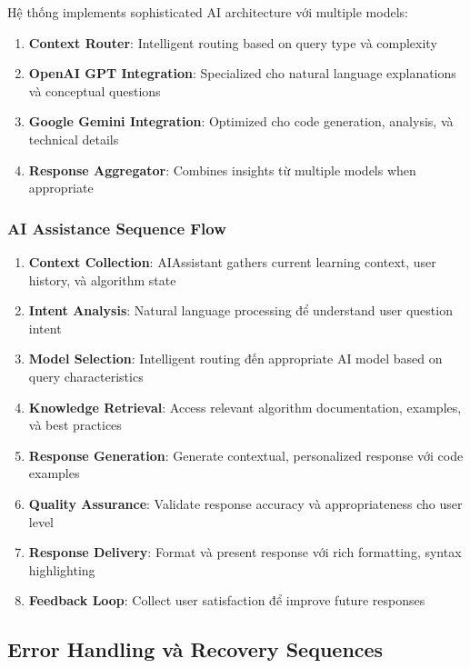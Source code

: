 Hệ thống implements sophisticated AI architecture với multiple models:

\begin{enumerate}
    \item \textbf{Context Router}: Intelligent routing based on query type và complexity
    \item \textbf{OpenAI GPT Integration}: Specialized cho natural language explanations và conceptual questions
    \item \textbf{Google Gemini Integration}: Optimized cho code generation, analysis, và technical details
    \item \textbf{Response Aggregator}: Combines insights từ multiple models when appropriate
\end{enumerate}

\subsubsection{AI Assistance Sequence Flow}

\begin{enumerate}
    \item \textbf{Context Collection}: AIAssistant gathers current learning context, user history, và algorithm state
    \item \textbf{Intent Analysis}: Natural language processing để understand user question intent
    \item \textbf{Model Selection}: Intelligent routing đến appropriate AI model based on query characteristics
    \item \textbf{Knowledge Retrieval}: Access relevant algorithm documentation, examples, và best practices
    \item \textbf{Response Generation}: Generate contextual, personalized response với code examples
    \item \textbf{Quality Assurance}: Validate response accuracy và appropriateness cho user level
    \item \textbf{Response Delivery}: Format và present response với rich formatting, syntax highlighting
    \item \textbf{Feedback Loop}: Collect user satisfaction để improve future responses
\end{enumerate}

\subsection{Error Handling và Recovery Sequences}
\label{subsec:error-handling-sequences}

